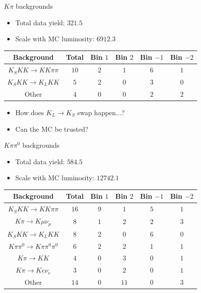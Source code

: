 \documentclass{beamer}
\begin{document}
\begin{frame}{$K\pi$ backgrounds}
  \begin{itemize}
    \item{Total data yield: $321.5$}
    \item{Scale with MC luminosity: $6912.3$}
  \end{itemize}
  \vspace{0.5cm}
  \centering
  \def\arraystretch{1.2}%
  \begin{tabular}{c|ccccc}
    Background              & Total  & Bin $1$ & Bin $2$ & Bin $-1$ & Bin $-2$ \\
    \hline
    $K_SKK\to KK\pi\pi$     & $10$   & $2$     & $1$     & $6$      & $1$ \\
    $K_SKK\to K_LKK$        & $5$    & $2$     & $0$     & $3$      & $0$ \\
    Other                   & $4$    & $0$     & $0$     & $2$      & $2$ \\
    \hline
  \end{tabular}
  \vspace{0.5cm}
  \begin{itemize}
    \item{How does $K_L\to K_S$ swap happen...?}
    \item{Can the MC be trusted?}
  \end{itemize}
\end{frame}

\begin{frame}{$K\pi\pi^0$ backgrounds}
  \begin{itemize}
    \item{Total data yield: $584.5$}
    \item{Scale with MC luminosity: $12742.1$}
  \end{itemize}
  \vspace{0.5cm}
  \centering
  \def\arraystretch{1.2}%
  \begin{tabular}{c|ccccc}
    Background                    & Total  & Bin $1$ & Bin $2$ & Bin $-1$ & Bin $-2$ \\
    \hline
    $K_SKK\to KK\pi\pi$           & $16$   & $9$     & $1$     & $5$      & $1$ \\
    $K\pi\to K\mu\nu_\mu$         & $8$    & $1$     & $2$     & $2$      & $3$ \\
    $K_SKK\to K_LKK$              & $8$    & $2$     & $0$     & $6$      & $0$ \\
    $K\pi\pi^0\to K\pi\pi^0\pi^0$ & $6$    & $2$     & $2$     & $1$      & $1$ \\
    $K\pi\to KK$                  & $4$    & $0$     & $3$     & $0$      & $1$ \\
    $K\pi\to Ke\nu_e$             & $3$    & $0$     & $2$     & $0$      & $1$ \\
    Other                         & $14$   & $0$     & $11$    & $0$      & $3$ \\
    \hline
  \end{tabular}
  \vspace{0.5cm}
\end{frame}
\end{document}
